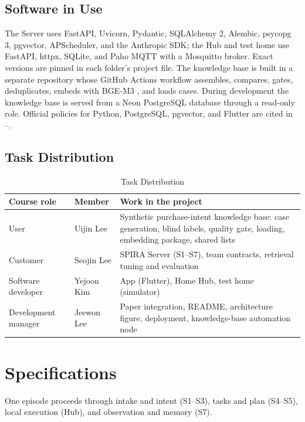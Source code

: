 \documentclass[conference]{IEEEtran}
\begin{document}
\subsection{Software in Use}
The Server uses FastAPI, Uvicorn, Pydantic, SQLAlchemy 2, Alembic, psycopg 3, pgvector, APScheduler, and the Anthropic SDK; the Hub and test home use FastAPI, httpx, SQLite, and Paho MQTT with a Mosquitto broker. Exact versions are pinned in each folder's project file. The knowledge base is built in a separate repository whose GitHub Actions workflow assembles, compares, gates, deduplicates, embeds with BGE-M3 \cite{ref15}, and loads cases. During development the knowledge base is served from a Neon PostgreSQL database through a read-only role. Official policies for Python, PostgreSQL, pgvector, and Flutter are cited in \cite{ref9}--\cite{ref14}.

\subsection{Task Distribution}
\begin{table}[H]
\caption{Task Distribution}
\centering
\footnotesize
\setlength{\tabcolsep}{2.5pt}
\renewcommand{\arraystretch}{1.08}
\begin{tabularx}{\columnwidth}{@{}L{0.17\columnwidth}L{0.16\columnwidth}X@{}}
\toprule
\textbf{Course role} & \textbf{Member} & \textbf{Work in the project} \\
\midrule
User & Uijin Lee & Synthetic purchase-intent knowledge base: case generation, blind labels, quality gate, loading, embedding package, shared lists \\
Customer & Seojin Lee & SPIRA Server (S1--S7), team contracts, retrieval tuning and evaluation \\
Software developer & Yejoon Kim & App (Flutter), Home Hub, test home (simulator) \\
Development manager & Jeewon Lee & Paper integration, README, architecture figure, deployment, knowledge-base automation node \\
\bottomrule
\end{tabularx}
\label{tab:tasks}
\end{table}

\section{Specifications}
One episode proceeds through intake and intent (S1--S3), tasks and plan (S4--S5), local execution (Hub), and observation and memory (S7).
\end{document}
